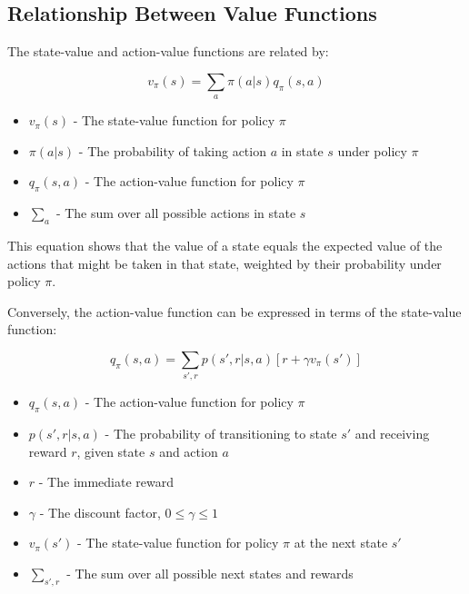 \documentclass[12pt,a4paper]{article}
\begin{document}
\subsection{Relationship Between Value Functions}

The state-value and action-value functions are related by:

\begin{equation}
v_\pi(s) = \sum_{a} \pi(a|s) q_\pi(s, a)
\end{equation}

\begin{tcolorbox}[title=Notation Overview]
\begin{itemize}
    \item $v_\pi(s)$ - The state-value function for policy $\pi$
    \item $\pi(a|s)$ - The probability of taking action $a$ in state $s$ under policy $\pi$
    \item $q_\pi(s,a)$ - The action-value function for policy $\pi$
    \item $\sum_{a}$ - The sum over all possible actions in state $s$
\end{itemize}
\end{tcolorbox}

This equation shows that the value of a state equals the expected value of the actions that might be taken in that state, weighted by their probability under policy $\pi$.

Conversely, the action-value function can be expressed in terms of the state-value function:

\begin{equation}
q_\pi(s, a) = \sum_{s', r} p(s', r|s, a) [r + \gamma v_\pi(s')]
\end{equation}

\begin{tcolorbox}[title=Notation Overview]
\begin{itemize}
    \item $q_\pi(s,a)$ - The action-value function for policy $\pi$
    \item $p(s', r|s, a)$ - The probability of transitioning to state $s'$ and receiving reward $r$, given state $s$ and action $a$
    \item $r$ - The immediate reward
    \item $\gamma$ - The discount factor, $0 \leq \gamma \leq 1$
    \item $v_\pi(s')$ - The state-value function for policy $\pi$ at the next state $s'$
    \item $\sum_{s', r}$ - The sum over all possible next states and rewards
\end{itemize}
\end{tcolorbox}
\end{document}
